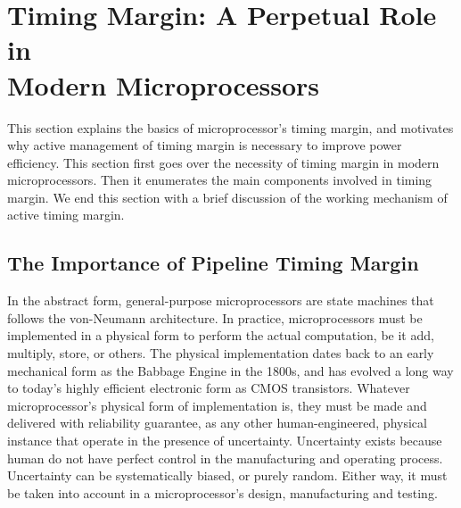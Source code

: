 
\chapter{Timing Margin: A Perpetual Role in \\Modern Microprocessors}
\label{sec:background}

This section explains the basics of microprocessor's timing margin, and motivates why active management of timing margin is necessary to improve power efficiency. This section first goes over the necessity of timing margin in modern microprocessors. Then it enumerates the main components involved in timing margin. We end this section with a brief discussion of the working mechanism of active timing margin.

\section{The Importance of Pipeline Timing Margin}
\label{sec:background:importance}

In the abstract form, general-purpose microprocessors are state machines that follows the von-Neumann architecture. In practice, microprocessors must be implemented in a physical form to perform the actual computation, be it add, multiply, store, or others. The physical implementation dates back to an early mechanical form as the Babbage Engine in the 1800s, and has evolved a long way to today's highly efficient electronic form as CMOS transistors. Whatever microprocessor's physical form of implementation is, they must be made and delivered with reliability guarantee, as any other human-engineered, physical instance that operate in the presence of uncertainty. Uncertainty exists because human do not have perfect control in the manufacturing and operating process. Uncertainty can be systematically biased, or purely random. Either way, it must be taken into account in a microprocessor's design, manufacturing and testing.

